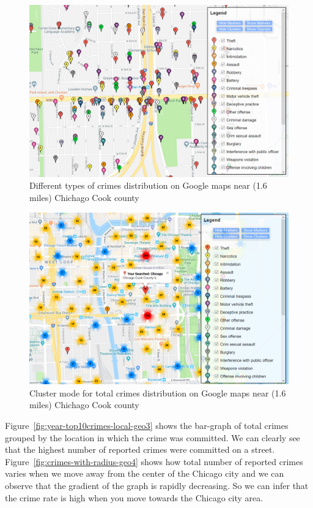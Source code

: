 \begin{figure}[htb]
	\centering\includegraphics[width=\columnwidth]{images/geo1.jpg}
	\caption{Different types of crimes distribution on Google maps near (1.6 miles) Chichago Cook county}\label{fig:time-totalCrime-geo1}
\end{figure}

\begin{figure}[htb]
	\centering\includegraphics[width=\columnwidth]{images/geo2.jpg}
	\caption{Cluster mode for total crimes distribution on Google maps near (1.6 miles) Chichago Cook county}\label{fig:time-top10crimes-local-geo2}
\end{figure}

Figure~\ref{fig:year-top10crimes-local-geo3} shows the bar-graph of
total crimes grouped by the location in which the crime was
committed. We can clearly see that the highest number of reported
crimes were committed on a
street. Figure~\ref{fig:crimes-with-radius-geo4} shows how total
number of reported crimes varies when we move away from the center of
the Chicago city and we can observe that the gradient of the graph is
rapidly decreasing. So we can infer that the crime rate is high when
you move towards the Chicago city area.

